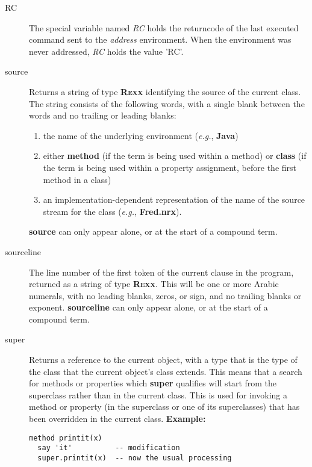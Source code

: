 \begin{description}
\item[RC]\label{refswrc}
 
The special variable named \emph{RC} holds the returncode of the last executed command sent
to the \emph{address} environment.
When the environment was never addressed, \emph{RC} holds the value 'RC'. 
\item[source]\label{refswsourc}
 
Returns a string of type \textbf{R\textsc{exx}} identifying the source of the
current class.
The string consists of the following words, with a single blank between
the words and no trailing or leading blanks:
\begin{enumerate}
\item the name of the underlying environment (\emph{e.g.}, \textbf{Java})
\item either \textbf{method} (if the term is being used within a method)
or \textbf{class} (if the term is being used within a property
assignment, before the first method in a class)
\item 
an implementation-dependent representation of the name of the
source stream for the class (\emph{e.g.}, \textbf{Fred.nrx}).
\end{enumerate}
 \textbf{source} can only appear alone, or at the start of a
compound term.
\item[sourceline]\label{refswsourl}
 
The line number of the first token of the current clause in the
\nr{} program, returned as a string of type \textbf{R\textsc{exx}}.
This will be one or more Arabic numerals, with no leading blanks, zeros,
or sign, and no trailing blanks or exponent.
 \textbf{sourceline} can only appear alone, or at the start of a
compound term.
\item[super]\label{refswsuper}
 
Returns a reference to the current object, with a type that is the
type of the class that the current object's class extends.
This means that a search for methods or properties
which \textbf{super} qualifies will start from the superclass rather
than in the current class.
This is used for invoking a method or property (in the superclass or one
of its superclasses) that has been overridden in the current class.
 \textbf{Example:}
\begin{lstlisting}
method printit(x)
  say 'it'          -- modification
  super.printit(x)  -- now the usual processing
\end{lstlisting}
 

\end{description}
